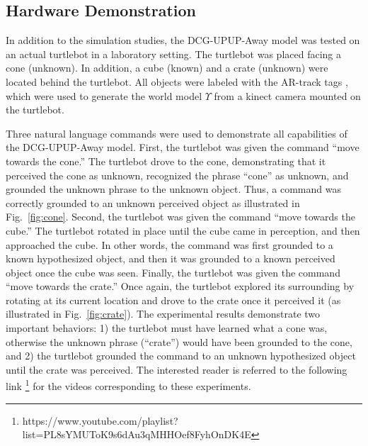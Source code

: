 \subsection{Hardware Demonstration}
In addition to the simulation studies, the DCG-UPUP-Away model was tested on an actual turtlebot in a laboratory setting.
The turtlebot was placed facing %
a cone (unknown).
In addition, a cube (known) and a crate (unknown) were located behind the turtlebot.
All objects were labeled with the AR-track tags \cite{olson2011}, which were used to generate the world model $\Upsilon$ from a kinect camera mounted on the turtlebot.

Three natural language commands were used to demonstrate all capabilities of the DCG-UPUP-Away model.
First, the turtlebot was given the command ``move towards the cone.''
The turtlebot drove to the cone, demonstrating that it perceived the cone as unknown, recognized the phrase ``cone'' as unknown, and grounded the unknown phrase to the unknown object.
Thus, a command was correctly grounded to an unknown perceived object as illustrated in Fig.~\ref{fig:cone}.
Second, the turtlebot was given the command ``move towards the cube.''
The turtlebot rotated in place until the cube came in perception, and then approached the cube.
In other words, the command was first grounded to a known hypothesized object, and then it was grounded to a known perceived object once the cube was seen. 
Finally, the turtlebot was given the command ``move towards the crate.''
Once again, the turtlebot explored its surrounding by rotating at its current location and drove to the crate once it perceived it (as illustrated in Fig.~\ref{fig:crate}). %
The experimental results demonstrate two important behaviors: 1) the turtlebot must have learned what a cone was, otherwise the unknown phrase (``crate'') would have been grounded to the cone, and 2) the turtlebot grounded the command to an unknown hypothesized object until the crate was perceived. The interested reader is referred to the following link \footnote{https://www.youtube.com/playlist?list=PL8sYMUToK9s6dAu3qMHHOef8FyhOnDK4E} for the videos corresponding to these experiments.


